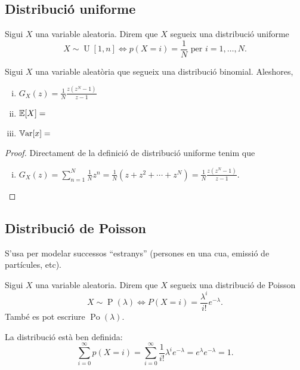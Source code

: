 \subsection*{Distribució uniforme}

\begin{defi}
    Sigui $X$ una variable aleatoria. Direm que $X$ segueix una distribució uniforme
    \[X \sim \operatorname{U}[1,n] \iff p(X=i)=\frac{1}{N} \text{ per } i = 1,\dots,N.\]
\end{defi}

\begin{prop} %
    Sigui $X$ una variable aleatòria que segueix una distribució binomial. Aleshores,
    \begin{enumerate}[i)]
     \item $G_X(z) =  \frac{1}{N}\frac{z(z^N-1)}{z-1}$
     \item $\operatorname{\mathbb{E}}[X]=$
     \item $\operatorname{\mathbb{V}ar}[x]=$
    \end{enumerate}
\end{prop}

\begin{proof}
  Directament de la definició de distribució uniforme tenim que
  \begin{enumerate}[i)]
   \item $G_X(z) = \sum_{n=1}^N \frac{1}{N}z^n = \frac{1}{N}(z+z^2+\cdots+z^N) = \frac{1}{N}\frac{z(z^N-1)}{z-1}$.
  \end{enumerate}
\end{proof}


\subsection*{Distribució de Poisson}

S'usa per modelar successos ``estranys'' (persones en una cua, emissió de partícules, etc).

\begin{defi}
    Sigui $X$ una variable aleatoria. Direm que $X$ segueix una distribució de Poisson
    \[X \sim \operatorname{P}(\lambda) \iff P(X=i) = \frac{\lambda^i }{i!}e^{-\lambda}.\]
    També es pot escriure $\operatorname{Po}(\lambda)$.
\end{defi}

\begin{obs}
    La distribució està ben definida:
    \[\sum_{i=0}^\infty p(X=i) = \sum_{i=0}^\infty \frac{1}{i!}\lambda^i e^{-\lambda} = e^\lambda e^{-\lambda} = 1.\]
\end{obs}

